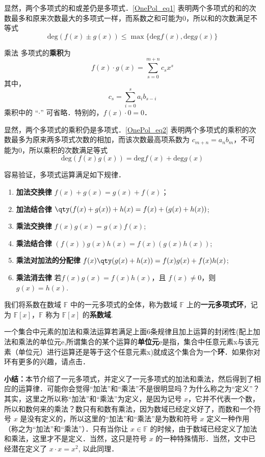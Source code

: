 显然，两个多项式的和或差仍是多项式．\autoref{OnePol_eq1} 表明两个多项式的和的次数最多和原来次数最大的多项式一样，而系数之和可能为0，所以和的次数满足不等式
\begin{equation}
\mathrm{deg}(f(x)\pm g(x))\leq \max\{\mathrm{deg}f(x),\mathrm{deg}g(x)\}
\end{equation}
\begin{definition}{乘法}
多项式的\textbf{乘积}为
\begin{equation}
f(x)\cdot g(x)=\sum_{s=0}^{m+n} c_s x^s
\label{OnePol_eq2}
\end{equation}
其中，
\begin{equation}
c_s=\sum_{i=0}^s a_i b_{s-i}
\end{equation}
乘积中的 “$\cdot$” 可省略．特别的，$f(x)\cdot 0=0$．
\end{definition}

显然，两个多项式的乘积仍是多项式．\autoref{OnePol_eq2} 表明两个多项式的乘积的次数最多为原来两多项式次数的相加，而该次数最高项系数为 $c_{m+n}=a_n b_m$，不可能为0，所以乘积的次数满足等式
\begin{equation}
\mathrm{deg}(f(x)g(x))= \mathrm{deg}f(x)+\mathrm{deg}g(x)
\end{equation}

容易验证，多项式运算满足如下规律．
\begin{enumerate}
\item \textbf{加法交换律} $f(x)+g(x)=g(x)+f(x)$；
\item \textbf{加法结合律} $\qty(f(x)+g(x))+h(x)=f(x)+(g(x)+h(x))$;
\item \textbf{乘法交换律} $f(x)g(x)=g(x)f(x)$;
\item \textbf{乘法结合律} $(f(x))g(x)h(x)=f(x)(g(x)h(x))$;
\item \textbf{乘法对加法的分配律} $f(x)\qty(g(x)+h(x))=f(x)g(x)+f(x)h(x)$;
\item \textbf{乘法消去律} 若$f(x)g(x)=f(x)h(x)$，且 $f(x)\neq0$，则 $g(x)=h(x)$.
\end{enumerate}
我们将系数在数域 $\mathbb{F}$ 中的一元多项式的全体，称为数域 $\mathbb{F}$ 上的\textbf{一元多项式环}，记为 $\mathbb{F}[x]$，$\mathbb{F}$ 称为 $\mathbb{F}[x]$ 的\textbf{系数域}.

一个集合中元素的加法和乘法运算若满足上面6条规律且加上运算的封闭性(配上加法和乘法的单位元e,所谓集合的某个运算的\textbf{单位元}e是指，集合中任意元素x与该元素（单位元）进行运算还是等于这个任意元素x)就成这个集合为一个\textbf{环}．如果你对环有更多的兴趣，请点击．

\textbf{小结：}本节介绍了一元多项式，并定义了一元多项式的加法和乘法，然后得到了相应的运算律．可能你会觉得“加法”和“乘法”不是很明显吗？为什么称之为“定义”？其实，这里之所以称“加法”和“乘法”为定义，是因为记号 $x$，它并不代表一个数，所以和数何来的乘法？数只有和数有乘法，因为数域已经定义好了，而数和一个符号 $x$ 是没有定义的，所以这里的“加法”和“乘法”是为数和符号 $x$ 定义一种作用（称之为“加法”和“乘法”）．只有当你让 $x\in \mathbb{F}$ 的时候，由于数域已经定义了加法和乘法，这里才不是定义．当然，这只是符号 $x$ 的一种特殊情形．当然，文中已经潜在定义了 $x\cdot x=x^2$, 以此同理．